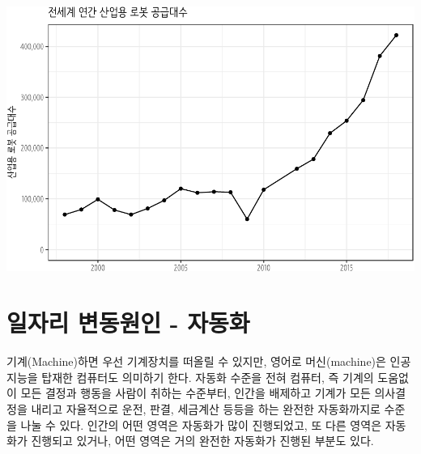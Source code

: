 \documentclass[smallextended]{svjour3}       %
\begin{document}
\begin{center}\includegraphics[width=0.77\linewidth]{paper_files/figure-latex/industrial-robot-1} \end{center}

\hypertarget{automation-overview}{%
\section{일자리 변동원인 - 자동화}\label{automation-overview}}

기계(Machine)하면 우선 기계장치를 떠올릴 수 있지만, 영어로
머신(machine)은 인공지능을 탑재한 컴퓨터도 의미하기 한다. 자동화 수준을
전혀 컴퓨터, 즉 기계의 도움없이 모든 결정과 행동을 사람이 취하는
수준부터, 인간을 배제하고 기계가 모든 의사결정을 내리고 자율적으로 운전,
판결, 세금계산 등등을 하는 완전한 자동화\cite{cummings2014man}까지로
수준을 나눌 수 있다. 인간의 어떤 영역은 자동화가 많이 진행되었고, 또
다른 영역은 자동화가 진행되고 있거나, 어떤 영역은 거의 완전한 자동화가
진행된 부분도 있다.

\begin{table}[H]
\centering
{}
\end{table}
\end{document}
